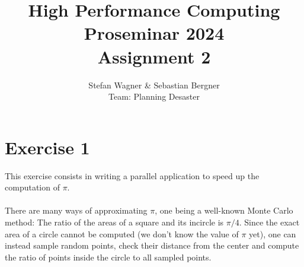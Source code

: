 \documentclass[UTF-8]{article}
\title{High Performance Computing Proseminar 2024 \\
    \large Assignment 2} %
\author{Stefan Wagner \& Sebastian Bergner\\Team: Planning Desaster}
\begin{document}
    
    \maketitle
    
    \section*{Exercise 1}
    This exercise consists in writing a parallel application to speed up the computation of $\pi$.
    \\
    \\
    There are many ways of approximating $\pi$, one being a well-known Monte Carlo method: The ratio of the areas of a square and its incircle is $\pi/4$. Since the exact area of a circle cannot be computed (we don't know the value of $\pi$ yet), one can instead sample random points, check their distance from the center and compute the ratio of points inside the circle to all sampled points.
    
\end{document}

